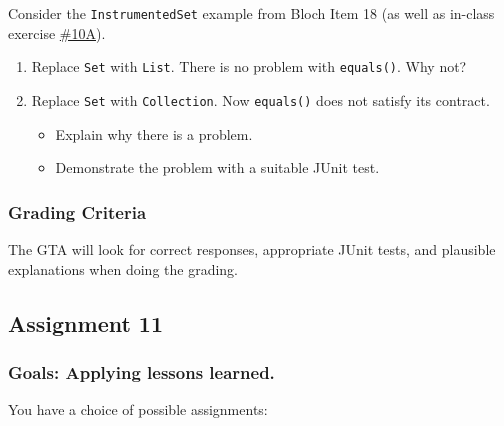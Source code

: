 \documentclass[11pt]{article}
\begin{document}
Consider the \texttt{InstrumentedSet} example from Bloch Item 18 (as well as in-class exercise \href{./inclass10A.html}{\#10A}).
\begin{enumerate}
\item Replace \texttt{Set} with \texttt{List}. There is no problem with \texttt{equals()}. Why not?
\item Replace \texttt{Set} with \texttt{Collection}. Now \texttt{equals()} does not satisfy its contract.
\begin{itemize}
\item Explain why there is a problem.
\item Demonstrate the problem with a suitable JUnit test.
\end{itemize}
\end{enumerate}



\subsubsection{Grading Criteria}
\label{sec:org9cd521d}
The GTA will look for correct responses, appropriate JUnit tests, and plausible explanations when doing the grading.


\subsection{Assignment 11}
\label{sec:orgf91f5c7}
\subsubsection{Goals: Applying lessons learned.}
\label{sec:orgbacb317}

You have a choice of possible assignments:
\end{document}
